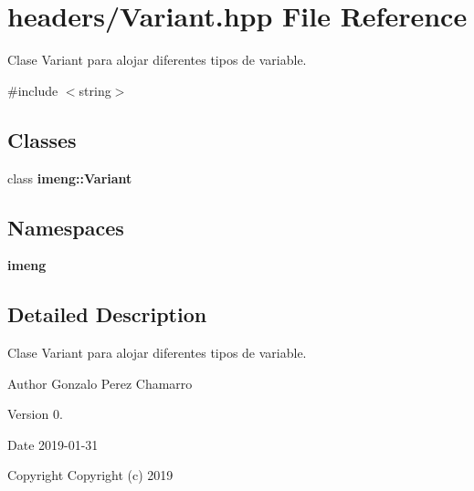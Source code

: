 \section{headers/\+Variant.hpp File Reference}
\label{_variant_8hpp}


Clase Variant para alojar diferentes tipos de variable.  


{\ttfamily \#include $<$string$>$}\newline
\subsection*{Classes}
\begin{DoxyCompactItemize}
\item 
class \textbf{ imeng\+::\+Variant}
\end{DoxyCompactItemize}
\subsection*{Namespaces}
\begin{DoxyCompactItemize}
\item 
 \textbf{ imeng}
\end{DoxyCompactItemize}


\subsection{Detailed Description}
Clase Variant para alojar diferentes tipos de variable. 

\begin{DoxyAuthor}{Author}
Gonzalo Perez Chamarro 
\end{DoxyAuthor}
\begin{DoxyVersion}{Version}
0. 
\end{DoxyVersion}
\begin{DoxyDate}{Date}
2019-\/01-\/31
\end{DoxyDate}
\begin{DoxyCopyright}{Copyright}
Copyright (c) 2019 
\end{DoxyCopyright}

